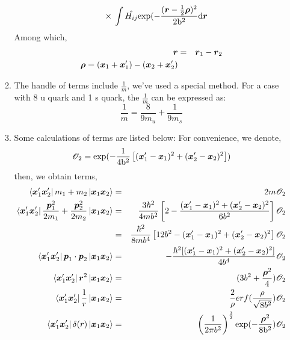 \documentclass[11pt]{article}
\newcommand{\bm}[1]{\mbox{\boldmath{$#1$}}}
\begin{document}
\begin{enumerate}
\begin{enumerate}
\begin{eqnarray}
&&{}\times{}\int\hat{H_{i j}}\rm{exp}(-\frac{(\bm{r}-\frac{1}{2}\bm{\rho})^2}{2b^2}\rm{d}\bm{r}
\end{eqnarray}
Among which,
\begin{eqnarray}
\bm{r}&=&\bm{r}_1-\bm{r}_2\\
\bm{\rho}=(\bm{x}_{1}+\bm{x}_{1}^\prime)-(\bm{x}_{2}+\bm{x}_{2}^\prime)
\end{eqnarray}
\item The handle of terms include $\frac{1}{m}$, we've used a special method.
For a case with 8 u quark and 1 s quark, the $\frac{1}{m}$ can be expressed as:
\begin{equation}
\frac{1}{m}=\frac{8}{9m_u}+\frac{1}{9m_s}
\end{equation}
\item Some calculations of terms are listed below:
For convenience, we denote,
\begin{equation}
\mathscr{O}_2=\rm{exp}(-\frac{1}{4b^2}\left[(\bm{x}_{1}^\prime-\bm{x}_{1})^2
+(\bm{x}_{2}^\prime-\bm{x}_{2})^2\right])
\end{equation}
then, we obtain terms,
\begin{eqnarray}
\bra{\bm{x}_{1}^\prime\bm{x}_{2}^\prime}m_{1}+m_{2}\ket{\bm{x}_{1}\bm{x}_{2}}&=&2m\mathscr{O}_2\\
\bra{\bm{x}_{1}^\prime\bm{x}_{2}^\prime}\frac{\bm{p}_{1}^2}{2m_{1}}+\frac{\bm{p}_{2}^2}{2m_{2}}\ket{\bm{x}_{1}\bm{x}_{2}}
&=&\frac{3\hbar^2}{4mb^2}\left[2-\frac{(\bm{x}_{1}^\prime-\bm{x}_{1})^2
+(\bm{x}_{2}^\prime-\bm{x}_{2})^2}{6b^2}\right]\mathscr{O}_2\nonumber\\
&=&\frac{\hbar^2}{8mb^4}\left[12b^2-(\bm{x}_{1}^\prime-\bm{x}_{1})^2
+(\bm{x}_{2}^\prime-\bm{x}_{2})^2\right]\mathscr{O}_2\\
\bra{\bm{x}_{1}^\prime\bm{x}_{2}^\prime}\bm{p}_1\cdot\bm{p}_2\ket{\bm{x}_{1}\bm{x}_{2}}&=&
-\frac{\hbar^2[(\bm{x}_{1}^\prime-\bm{x}_{1})^2
+(\bm{x}_{2}^\prime-\bm{x}_{2})^2]}{4b^4}\mathscr{O}_2\\
\bra{\bm{x}_{1}^\prime\bm{x}_{2}^\prime}\bm{r}^2\ket{\bm{x}_{1}\bm{x}_{2}}&=&(3b^2+\frac{\bm{\rho}^2}{4})\mathscr{O}_2\\
\bra{\bm{x}_{1}^\prime\bm{x}_{2}^\prime}\frac{1}{r}\ket{\bm{x}_{1}\bm{x}_{2}}&=&\frac{2}{\rho}erf(\frac{\rho}{\sqrt{8b^2}})\mathscr{O}_2\\
\bra{\bm{x}_{1}^\prime\bm{x}_{2}^\prime}\delta(r)\ket{\bm{x}_{1}\bm{x}_{2}}&=&\left(\frac{1}{2\pi{}b^2}\right)^{\frac{3}{2}}
\rm{exp}(-\frac{\bm{\rho}^2}{8b^2})\mathscr{O}_2
\end{eqnarray}

\end{enumerate}
\end{enumerate}
\end{document}
